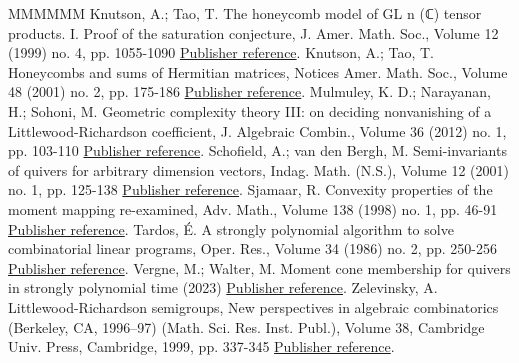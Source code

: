 \begin{thebibliography}{MMMMMM}
 Knutson, A.; Tao, T. The honeycomb model of  GL  n (ℂ) tensor products. I. Proof of the saturation conjecture, J. Amer. Math. Soc., Volume 12 (1999) no. 4, pp. 1055-1090 \href{https://alco.centre-mersenne.org/articles/10.5802/alco.398/#KT}{Publisher reference}.
 Knutson, A.; Tao, T. Honeycombs and sums of Hermitian matrices, Notices Amer. Math. Soc., Volume 48 (2001) no. 2, pp. 175-186 \href{https://alco.centre-mersenne.org/articles/10.5802/alco.398/#KT2}{Publisher reference}.
 Mulmuley, K. D.; Narayanan, H.; Sohoni, M. Geometric complexity theory III: on deciding nonvanishing of a Littlewood-Richardson coefficient, J. Algebraic Combin., Volume 36 (2012) no. 1, pp. 103-110 \href{https://alco.centre-mersenne.org/articles/10.5802/alco.398/#MNS}{Publisher reference}.
 Schofield, A.; van den Bergh, M. Semi-invariants of quivers for arbitrary dimension vectors, Indag. Math. (N.S.), Volume 12 (2001) no. 1, pp. 125-138 \href{https://alco.centre-mersenne.org/articles/10.5802/alco.398/#SVB}{Publisher reference}.
 Sjamaar, R. Convexity properties of the moment mapping re-examined, Adv. Math., Volume 138 (1998) no. 1, pp. 46-91 \href{https://alco.centre-mersenne.org/articles/10.5802/alco.398/#Sj}{Publisher reference}.
 Tardos, É. A strongly polynomial algorithm to solve combinatorial linear programs, Oper. Res., Volume 34 (1986) no. 2, pp. 250-256 \href{https://alco.centre-mersenne.org/articles/10.5802/alco.398/#Tar86}{Publisher reference}.
 Vergne, M.; Walter, M. Moment cone membership for quivers in strongly polynomial time (2023) \href{https://alco.centre-mersenne.org/articles/10.5802/alco.398/#Ver-Wal-2023}{Publisher reference}.
 Zelevinsky, A. Littlewood-Richardson semigroups, New perspectives in algebraic combinatorics (Berkeley, CA, 1996–97) (Math. Sci. Res. Inst. Publ.), Volume 38, Cambridge Univ. Press, Cambridge, 1999, pp. 337-345 \href{https://alco.centre-mersenne.org/articles/10.5802/alco.398/#Zel-1999}{Publisher reference}.
\end{thebibliography}

